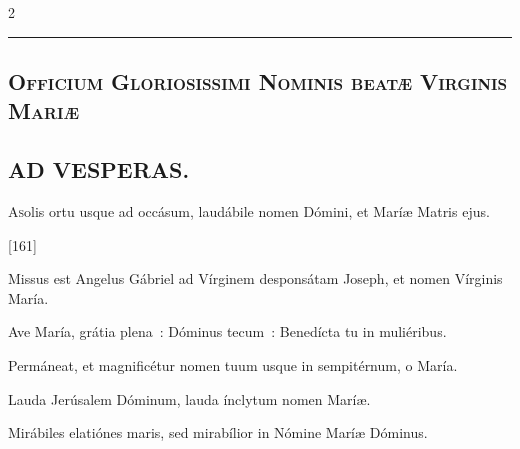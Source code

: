 \documentclass[9pt,twoside]{extarticle}
\begin{document}
\begin{multicols}{2}
{\begin{center}\textcolor{red}{\rule{\linewidth}{0.5pt}} \end{center}

\subsection*{\center \textsc{Officium Gloriosissimi Nominis beatæ Virginis Mariæ}}
\subsubsection*{\center {}}
\begin{center}\end{center}


\subsection*{\center \textsc{AD VESPERAS.}}
\begin{center}\end{center}
\lettrine{A} solis ortu usque ad occásum, laudábile nomen Dómini, et Maríæ Matris ejus.

\begin{tightlist}{}
\item {} [161]
\item {} Missus est Angelus Gábriel ad Vírginem desponsátam Joseph, et nomen Vírginis María.
\item {} Ave María, grátia plena~: Dóminus tecum~: Benedícta tu in muliéribus.
\item {} Permáneat, et magnificétur nomen tuum usque in sempitérnum, o María.
\item {} Lauda Jerúsalem Dóminum, lauda ínclytum nomen Maríæ.
\item {} Mirábiles elatiónes maris, sed mirabílior in Nómine Maríæ Dóminus. 
\end{tightlist}

}
\end{multicols}
\end{document}
